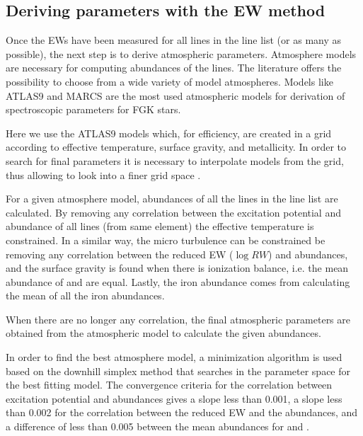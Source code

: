 \documentclass{aa}
\begin{document}
\subsection{Deriving parameters with the EW method}
\label{sec:deriving_parameters_with_the_ew_method}

Once the EWs have been measured for all lines in the line list (or as
many as possible), the next step is to derive atmospheric parameters.
Atmosphere models are necessary for computing abundances of the lines.
The literature offers the possibility to choose from a wide variety
of model atmospheres. Models like ATLAS9 \citep{Kurucz1993} and
MARCS \citep{Gustafson2008} are the most used atmospheric models for
derivation of spectroscopic parameters for FGK stars.

Here we use the ATLAS9 models which, for efficiency, are created
in a grid according to effective temperature, surface gravity, and
metallicity. In order to search for final parameters it is necessary to
interpolate models from the grid, thus allowing to look into a finer
grid space \citep[see e.g.][]{Sousa2014}.

For a given atmosphere model, abundances of all the lines in the line
list are calculated. By removing any correlation between the excitation
potential and abundance of all lines (from same element) the effective
temperature is constrained. In a similar way, the micro turbulence
can be constrained be removing any correlation between the reduced
EW ($\log RW$) and abundances, and the surface gravity is found when
there is ionization balance, i.e. the mean abundance of 
and  are equal. Lastly, the iron abundance comes from
calculating the mean of all the iron abundances.

When there are no longer any correlation, the final atmospheric
parameters are obtained from the atmospheric model to calculate the
given abundances.

In order to find the best atmosphere model, a minimization algorithm
is used based on the downhill simplex method \citep{Press1992} that
searches in the parameter space for the best fitting model. The
convergence criteria for the correlation between excitation potential
and abundances gives a slope less than 0.001, a slope less than
0.002 for the correlation between the reduced EW and the abundances,
and a difference of less than 0.005 between the mean abundances for
 and .
\end{document}
